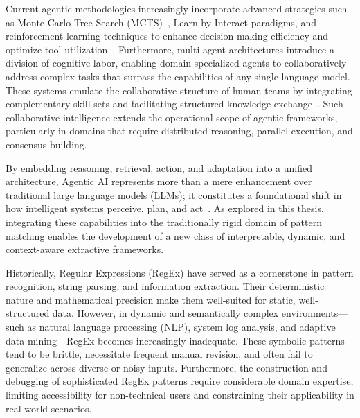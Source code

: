 Current agentic methodologies increasingly incorporate advanced strategies such as Monte Carlo Tree Search (MCTS)~\cite{chaslot2010monte, bax2020determinization, rimmel2009improvements}, Learn-by-Interact paradigms, and reinforcement learning techniques to enhance decision-making efficiency and optimize tool utilization~\cite{yao2023mcts, shinn2023reflexion}. Furthermore, multi-agent architectures introduce a division of cognitive labor, enabling domain-specialized agents to collaboratively address complex tasks that surpass the capabilities of any single language model. These systems emulate the collaborative structure of human teams by integrating complementary skill sets and facilitating structured knowledge exchange~\cite{park2023social, wu2024agenttuning}. Such collaborative intelligence extends the operational scope of agentic frameworks, particularly in domains that require distributed reasoning, parallel execution, and consensus-building.


\vspace{0.5cm}


By embedding reasoning, retrieval, action, and adaptation into a unified architecture, Agentic AI represents more than a mere enhancement over traditional large language models (LLMs); it constitutes a foundational shift in how intelligent systems perceive, plan, and act~\cite{ferrag2025can, shinn2023reflexion}. As explored in this thesis, integrating these capabilities into the traditionally rigid domain of pattern matching enables the development of a new class of interpretable, dynamic, and context-aware extractive frameworks.

\vspace{0.5cm}

Historically, Regular Expressions (RegEx) have served as a cornerstone in pattern recognition, string parsing, and information extraction. Their deterministic nature and mathematical precision make them well-suited for static, well-structured data. However, in dynamic and semantically complex environments—such as natural language processing (NLP), system log analysis, and adaptive data mining—RegEx becomes increasingly inadequate. These symbolic patterns tend to be brittle, necessitate frequent manual revision, and often fail to generalize across diverse or noisy inputs. Furthermore, the construction and debugging of sophisticated RegEx patterns require considerable domain expertise, limiting accessibility for non-technical users and constraining their applicability in real-world scenarios.

